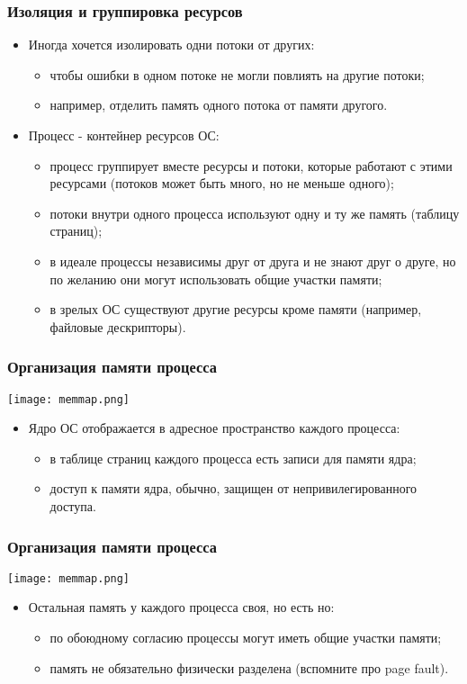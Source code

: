 \begin{frame}
\frametitle{Изоляция и группировка ресурсов}
\begin{itemize}
  \item Иногда хочется изолировать одни потоки от других:
  \begin{itemize}
    \item чтобы ошибки в одном потоке не могли повлиять на другие потоки;
    \item например, отделить память одного потока от памяти другого.
  \end{itemize}
  \item Процесс - контейнер ресурсов ОС:
  \begin{itemize}
    \item процесс группирует вместе ресурсы и потоки, которые работают с этими
    ресурсами (потоков может быть много, но не меньше одного);
    \item потоки внутри одного процесса используют одну и ту же память (таблицу
    страниц);
    \item в идеале процессы независимы друг от друга и не знают друг о друге,
    но по желанию они могут использовать общие участки памяти;
    \item в зрелых ОС существуют другие ресурсы кроме памяти (например, файловые
    дескрипторы).
  \end{itemize}
\end{itemize}
\end{frame}

\begin{frame}
\frametitle{Организация памяти процесса}
\begin{center}
  \texttt{[image: memmap.png]}
\end{center}
\begin{itemize}
  \item Ядро ОС отображается в адресное пространство каждого процесса:
  \begin{itemize}
    \item в таблице страниц каждого процесса есть записи для памяти ядра;
    \item доступ к памяти ядра, обычно, защищен от непривилегированного доступа.
  \end{itemize}
\end{itemize}
\end{frame}

\begin{frame}
\frametitle{Организация памяти процесса}
\begin{center}
  \texttt{[image: memmap.png]}
\end{center}
\begin{itemize}
  \item Остальная память у каждого процесса своя, но есть но:
  \begin{itemize}
    \item по обоюдному согласию процессы могут иметь общие участки памяти;
    \item память не обязательно физически разделена (вспомните про page fault).
  \end{itemize}
\end{itemize}
\end{frame}


